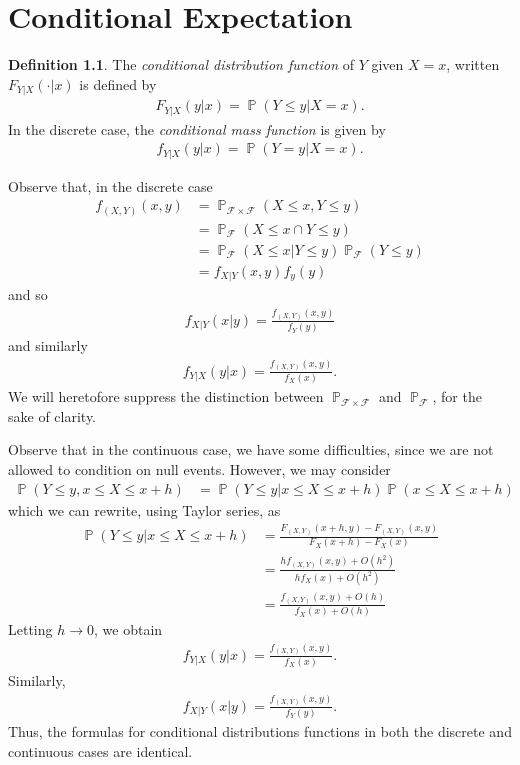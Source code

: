 \documentclass[12pt]{amsbook}
\newcommand{\filter}{\mathcal{F}}
\DeclareMathOperator{\prob}{\mathbb{P}}
\theoremstyle{plain}
\theoremstyle{definition}
\newtheorem*{definition}{Definition}
\theoremstyle{remark}
\numberwithin{equation}{section}  %
\numberwithin{equation}{section}  %
\begin{document}
	\chapter{Conditional Expectation}
	\begin{definition}
		The \emph{conditional distribution function} of $Y$ given $X = x$,
		written $F_{Y|X}(\cdot | x)$ is defined by
		\begin{align*}
			F_{Y|X}(y|x) = \prob (Y \le y | X = x).
		\end{align*}
		In the discrete case, the \emph{conditional mass function}
		is given by
		\begin{align*}
			f_{Y|X}(y|x) = \prob(Y = y | X = x).
		\end{align*}
	\end{definition}
	Observe that, in the discrete case
	\begin{align*}
		f_{(X,Y)}(x,y)
		& = \prob_{\filter \times \filter}(X \le x, Y \le y)
		\\
		& = \prob_{\filter} (X \le x \cap Y \le y)
		\\
		& = \prob_{\filter}(X \le x | Y \le y) \prob_{\filter}(Y \le y)
		\\
		& = f_{X|Y}	(x,y) f_y(y)	
	\end{align*}
	and so
	\begin{align*}
		f_{X|Y}(x|y) = \frac{f_{(X,Y)}(x,y)}{f_Y(y)}
	\end{align*}
	and similarly
	\begin{align*}
		f_{Y|X}(y|x) = \frac{f_{(X,Y)}(x,y)}{f_X(x)}.
	\end{align*}
	We will heretofore suppress the distinction between $\prob_{\filter \times
	\filter}$ and $\prob_{\filter}$, for the sake of clarity.

	Observe that in
	the continuous case, we have some difficulties,
	since we are not allowed to condition on null events. However, we may consider
	\begin{align*}
		\prob(Y \le y , x \le X \le x + h)
		& = \prob(Y \le y | x \le X \le x +h) \prob(x \le X \le x + h)
	\end{align*}
	which we can rewrite, using Taylor series, as
	\begin{align*}
		\prob(Y \le y | x \le X \le x + h)
		& = \frac{F_{(X,Y)}(x+h,y ) - F_{(X,Y)}(x,y )}{F_X(x+h) - F_X(x)}
		\\
		& = \frac{hf_{(X,Y)}(x,y) + O(h^2)}{hf_X(x) + O(h^2)}
		\\
		& = \frac{f_{(X,Y)}(x,y) + O(h)}{f_X(x) + O(h)}
	\end{align*}
	Letting $h \to 0$, we obtain
	\begin{align*}
		f_{Y|X}(y|x) = \frac{f_{(X,Y)}(x,y)}{f_X(x)}.
	\end{align*}
	Similarly, 
	\begin{align*}
		f_{X|Y}(x|y) = \frac{f_{(X,Y)}(x,y)}{f_Y(y)}.
	\end{align*}
	Thus, the formulas for conditional distributions
	functions in both the discrete and continuous cases are identical.
\end{document}
